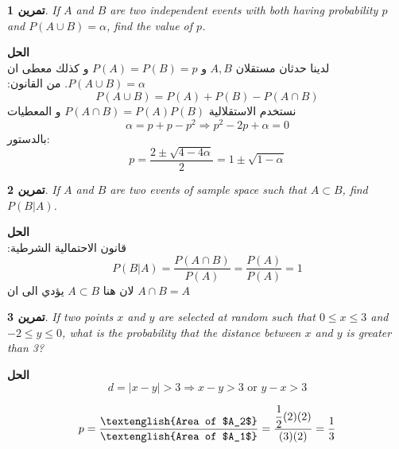 \documentclass[14pt, a4paper, leqno]{extarticle}
\newcommand{\en}{\textenglish}
\theoremstyle{theoremstyle}
\newtheorem{example}{تمرين}
\newenvironment{solution}{\noindent\textbf{الحل}\vspace{3pt}\\}{}
\begin{document}
	\begin{example}
		\en{If \(A\) and \(B\) are two independent events with both having probability \(p\) and \(P(A \cup B) = \alpha\), find the value of \(p\).}
	\end{example}
	
	\begin{solution}
		لدينا حدثان مستقلان \(A,B\) و \(P(A) = P(B) = p\) و كذلك معطى ان \(P(A\cup B) = \alpha\). من القانون:
		\[
		P(A\cup B) = P(A) + P(B) - P(A \cap B)
		\]
		نستخدم الاستقلالية \(P(A\cap B) = P(A)P(B)\) و المعطيات
		\[
		\alpha = p+p - p^2 \Rightarrow p^2-2p+\alpha = 0
		\]
		بالدستور:
		\[
		p = \frac{2\pm\sqrt{4-4\alpha}}{2} = 1\pm \sqrt{1-\alpha}
		\]
	\end{solution}
	
	\begin{example}
		\en{If \(A\) and \(B\) are two events of sample space such that \(A \subset B\), find \(P(B|A)\).}
	\end{example}
	
	\begin{solution}
		قانون الاحتمالية الشرطية:
		\[
		P(B|A) = \frac{P(A\cap B)}{P(A)} = \frac{P(A)}{P(A)} = 1
		\]
		لان هنا \(A\subset B\) يؤدي الى ان \(A\cap B = A\)
	\end{solution}
	
	\begin{example}
		\en{If two points \(x\) and \(y\) are selected at random such that \(0\leq x \leq 3\) and \(-2 \leq y \leq 0\), what is the probability that the distance between \(x\) and \(y\) is greater than 3?}
	\end{example}
	
	\begin{solution}
		\[
		d = |x-y| > 3 \Rightarrow x-y > 3 \,\, \text{or} \,\, y-x > 3
		\]
		
		\begin{center}
		\end{center}

		\[
         p = \frac{\text{\en{Area of $A_2$}}}{\text{\en{Area of $A_1$}}} = \frac{\dfrac{1}{2}(2)(2)}{(3)(2)} = \frac{1}{3}
		\]
	\end{solution}
\end{document}
